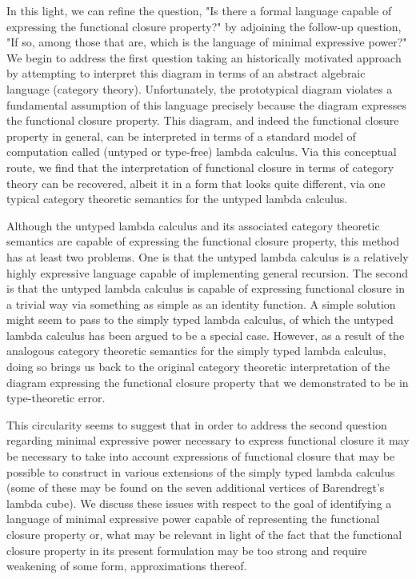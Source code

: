 \documentclass[10pt]{article}
\begin{document}
In this light, we can refine the question, "Is there a formal language capable of expressing the functional closure property?" by adjoining the follow-up question, "If so, among those that are, which is the language of minimal expressive power?" We begin to address the first question taking an historically motivated approach  by attempting to interpret this diagram in terms of an abstract algebraic language (category theory). Unfortunately, the prototypical diagram violates a fundamental assumption of this language precisely because the diagram expresses the functional closure property. This diagram, and indeed the functional closure property in general, can be interpreted in terms of a standard model of computation called (untyped or type-free) lambda calculus. Via this conceptual route, we find that the interpretation of functional closure in terms of category theory can be recovered, albeit it in a form that looks quite different, via one typical category theoretic semantics for the untyped lambda calculus.

Although the untyped lambda calculus and its associated category theoretic semantics are capable of expressing the functional closure property, this method has at least two problems. One is that the untyped lambda calculus is a relatively highly expressive language capable of implementing general recursion. The second is that the untyped lambda calculus is capable of expressing functional closure in a trivial way via something as simple as an identity function. A simple solution might seem to pass to the simply typed lambda calculus, of which the untyped lambda calculus has been argued to be a special case. However, as a result of the analogous category theoretic semantics for the simply typed lambda calculus, doing so brings us back to the original category theoretic interpretation of the diagram expressing the functional closure property that we demonstrated to be in type-theoretic error.

This circularity seems to suggest that in order to address the second question regarding minimal expressive power necessary to express functional closure it may be necessary to take into account expressions of functional closure that may be possible to construct in various extensions of the simply typed lambda calculus (some of these may be found on the seven additional vertices of Barendregt's lambda cube). We discuss these issues with respect to the goal of identifying a language of minimal expressive power capable of representing the functional closure property or, what may be relevant in light of the fact that the functional closure property in its present formulation may be too strong and require weakening of some form, approximations thereof.
\end{document}
